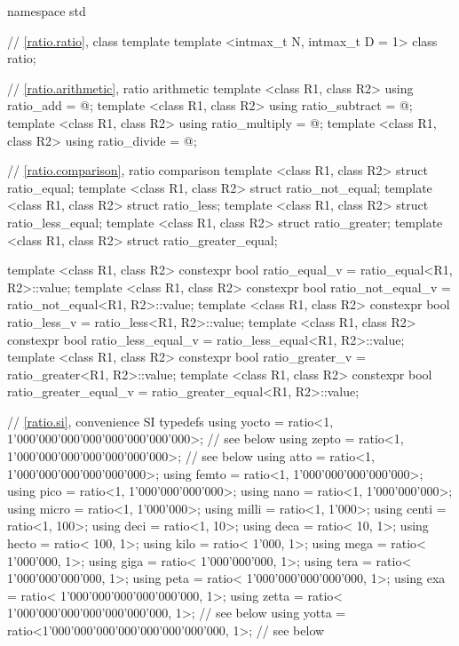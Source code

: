 %
%
\begin{codeblockdigitsep}
namespace std {
  // \ref{ratio.ratio}, class template 
  template <intmax_t N, intmax_t D = 1> class ratio;

  // \ref{ratio.arithmetic}, ratio arithmetic
  template <class R1, class R2> using ratio_add = @\seebelow@;
  template <class R1, class R2> using ratio_subtract = @\seebelow@;
  template <class R1, class R2> using ratio_multiply = @\seebelow@;
  template <class R1, class R2> using ratio_divide = @\seebelow@;

  // \ref{ratio.comparison}, ratio comparison
  template <class R1, class R2> struct ratio_equal;
  template <class R1, class R2> struct ratio_not_equal;
  template <class R1, class R2> struct ratio_less;
  template <class R1, class R2> struct ratio_less_equal;
  template <class R1, class R2> struct ratio_greater;
  template <class R1, class R2> struct ratio_greater_equal;

  template <class R1, class R2>
    constexpr bool ratio_equal_v = ratio_equal<R1, R2>::value;
  template <class R1, class R2>
    constexpr bool ratio_not_equal_v = ratio_not_equal<R1, R2>::value;
  template <class R1, class R2>
    constexpr bool ratio_less_v = ratio_less<R1, R2>::value;
  template <class R1, class R2>
    constexpr bool ratio_less_equal_v = ratio_less_equal<R1, R2>::value;
  template <class R1, class R2>
    constexpr bool ratio_greater_v = ratio_greater<R1, R2>::value;
  template <class R1, class R2>
    constexpr bool ratio_greater_equal_v = ratio_greater_equal<R1, R2>::value;

  // \ref{ratio.si}, convenience SI typedefs
  using yocto = ratio<1, 1'000'000'000'000'000'000'000'000>;  // see below
  using zepto = ratio<1,     1'000'000'000'000'000'000'000>;  // see below
  using atto  = ratio<1,         1'000'000'000'000'000'000>;
  using femto = ratio<1,             1'000'000'000'000'000>;
  using pico  = ratio<1,                 1'000'000'000'000>;
  using nano  = ratio<1,                     1'000'000'000>;
  using micro = ratio<1,                         1'000'000>;
  using milli = ratio<1,                             1'000>;
  using centi = ratio<1,                               100>;
  using deci  = ratio<1,                                10>;
  using deca  = ratio<                               10, 1>;
  using hecto = ratio<                              100, 1>;
  using kilo  = ratio<                            1'000, 1>;
  using mega  = ratio<                        1'000'000, 1>;
  using giga  = ratio<                    1'000'000'000, 1>;
  using tera  = ratio<                1'000'000'000'000, 1>;
  using peta  = ratio<            1'000'000'000'000'000, 1>;
  using exa   = ratio<        1'000'000'000'000'000'000, 1>;
  using zetta = ratio<    1'000'000'000'000'000'000'000, 1>;  // see below
  using yotta = ratio<1'000'000'000'000'000'000'000'000, 1>;  // see below
}
\end{codeblockdigitsep}

